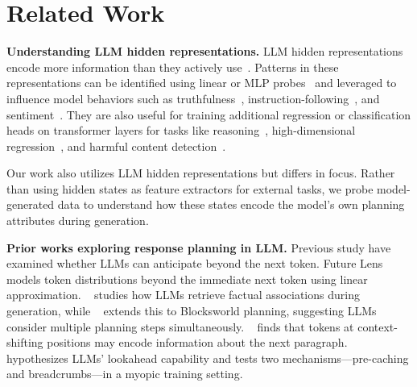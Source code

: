 \section{Related Work}


\textbf{Understanding LLM hidden representations.}
LLM hidden representations encode more information than they actively use~\cite{saunders2022self, burns2022discovering}. Patterns in these representations can be identified using linear or MLP probes~\cite{nostalgebraist2020logitlens, li2022emergent, belrose2023eliciting, zou2023representation, ji2024llm} and leveraged to influence model behaviors such as truthfulness~\cite{hernandez2023inspecting, li2024inference}, instruction-following~\cite{heo2024llms}, and sentiment~\cite{turner2024steeringlanguagemodelsactivation}. They are also useful for training additional regression or classification heads on transformer layers for tasks like reasoning~\cite{han2024token, damani2024learning}, high-dimensional regression~\cite{tang2024understanding}, and harmful content detection~\cite{rateike2023weakly, macdiarmid2024simple, qian2024hsf}.

Our work also utilizes LLM hidden representations but differs in focus. Rather than using hidden states as feature extractors for external tasks, we probe model-generated data to understand how these states encode the model’s own planning attributes during generation.

\textbf{Prior works exploring response planning in LLM.}
Previous study have examined whether LLMs can anticipate beyond the next token. Future Lens~\cite{pal2023future} models token distributions beyond the immediate next token using linear approximation. ~\cite{geva2023dissecting} studies how LLMs retrieve factual associations during generation, while ~\cite{men2024unlocking} extends this to Blocksworld planning, suggesting LLMs consider multiple planning steps simultaneously. ~\cite{pochinkov2024extracting} finds that tokens at context-shifting positions may encode information about the next paragraph. ~\cite{wu2024language} hypothesizes LLMs’ lookahead capability and tests two mechanisms—pre-caching and breadcrumbs—in a myopic training setting.

